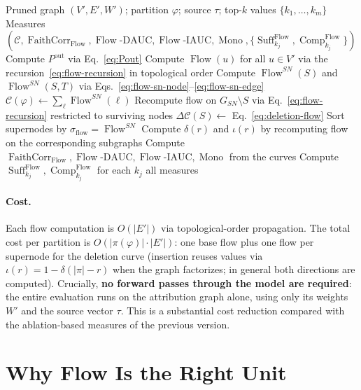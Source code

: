 \documentclass[11pt]{article}
\DeclareMathOperator{\Flow}{Flow}
\DeclareMathOperator{\Suff}{Suff}
\DeclareMathOperator{\Comp}{Comp}
\DeclareMathOperator{\Mono}{Mono}
\DeclareMathOperator{\FaithCorr}{FaithCorr}
\begin{document}
\begin{algorithm}[h]
\caption{Flow-based XAI evaluation of a supernode partition}
\label{alg:flow-xai}
\begin{algorithmic}[1]
\REQUIRE Pruned graph $(V', E', W')$; partition $\varphi$; source $\tau$;
top-$k$ values $\{k_1, \ldots, k_m\}$
\ENSURE Measures $(\mathcal{C}, \FaithCorr_{\Flow}, \Flow\text{-}\mathrm{DAUC},
                   \Flow\text{-}\mathrm{IAUC}, \Mono, \{\Suff_{k_j}^{\Flow}, \Comp_{k_j}^{\Flow}\})$
\STATE Compute $P^{\text{out}}$ via Eq.~\eqref{eq:Pout}
\STATE Compute $\Flow(u)$ for all $u \in V'$ via the
       recursion~\eqref{eq:flow-recursion} in topological order
\STATE Compute $\Flow^{SN}(S)$ and $\Flow^{SN}(S, T)$ via
       Eqs.~\eqref{eq:flow-sn-node}--\eqref{eq:flow-sn-edge}
\STATE $\mathcal{C}(\varphi) \gets \sum_{\ell} \Flow^{SN}(\ell)$
  \STATE Recompute flow on $G_{SN} \setminus S$ via
         Eq.~\eqref{eq:flow-recursion} restricted to surviving nodes
  \STATE $\Delta \mathcal{C}(S) \gets$ Eq.~\eqref{eq:deletion-flow}
\ENDFOR
\STATE Sort supernodes by $\sigma_{\text{flow}} = \Flow^{SN}$
  \STATE Compute $\delta(r)$ and $\iota(r)$ by recomputing flow on
         the corresponding subgraphs
\ENDFOR
\STATE Compute $\FaithCorr_{\Flow}, \Flow\text{-}\mathrm{DAUC},
       \Flow\text{-}\mathrm{IAUC}, \Mono$ from the curves
\STATE Compute $\Suff_{k_j}^{\Flow}, \Comp_{k_j}^{\Flow}$ for each $k_j$
\RETURN all measures
\end{algorithmic}
\end{algorithm}

\paragraph{Cost.}
Each flow computation is $O(|E'|)$ via topological-order
propagation. The total cost per partition is $O(|\pi(\varphi)| \cdot |E'|)$:
one base flow plus one flow per supernode for the deletion curve
(insertion reuses values via $\iota(r) = 1 - \delta(|\pi| - r)$ when
the graph factorizes; in general both directions are computed).
Crucially, \textbf{no forward passes through the model are
required}: the entire evaluation runs on the attribution graph
alone, using only its weights $W'$ and the source vector $\tau$.
This is a substantial cost reduction compared with the ablation-based
measures of the previous version.

\section{Why Flow Is the Right Unit}\label{sec:discussion}
\end{document}
